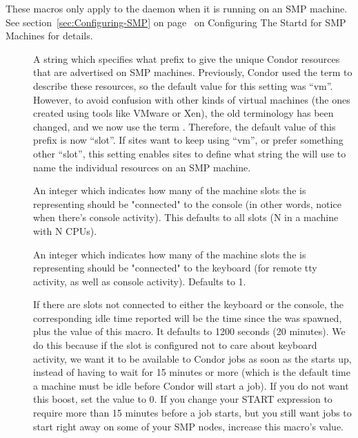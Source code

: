 These macros only apply to the  daemon when it is running on an
SMP machine. 
See section~\ref{sec:Configuring-SMP} on
page~\pageref{sec:Configuring-SMP} on Configuring The Startd for 
SMP Machines for details.

\begin{description}

\item[] 
\label{param:StartdResourcePrefix}
  A string which specifies what prefix to give the unique Condor
  resources that are advertised on SMP machines.
  Previously, Condor used the term  to describe
  these resources, so the default value for this setting was ``vm''.
  However, to avoid confusion with other kinds of virtual machines
  (the ones created using tools like VMware or Xen), the old
   terminology has been changed, and we now use
  the term .
  Therefore, the default value of this prefix is now ``slot''.
  If sites want to keep using ``vm'', or prefer something other
  ``slot'', this setting enables sites to define what string the
   will use to name the individual resources on an SMP
  machine.

\item[] 
\label{param:SlotsConnectedToConsole}
  An integer which indicates how many of the machine slots
  the  is representing should be "connected" to the
  console (in other words, notice when there's console activity).
  This defaults to all slots (N in a machine with N CPUs).

\item[]
\label{param:SlotsConnectedToKeyboard}
  An integer which indicates how many of the machine slots
  the  is representing should be "connected" to the
  keyboard (for remote tty activity, as well as console activity).
  Defaults to 1.

\item[]
\label{param:DisconnectedKeyboardIdleBoost}
  If there are slots not connected to either the keyboard
  or the console, the corresponding idle time reported will be the
  time since the  was spawned, plus the value of this macro.
  It defaults to 1200 seconds (20 minutes). 
  We do this because if the slot is configured not to care
  about keyboard activity, we want it to be available to Condor jobs
  as soon as the  starts up, instead of having to wait for 15
  minutes or more (which is the default time a machine must be idle
  before Condor will start a job).
  If you do not want this boost, set the value to 0.  
  If you change your START expression to require more than 15 minutes
  before a job starts, but you still want jobs to start right away on
  some of your SMP nodes, increase this macro's value.


\end{description}
